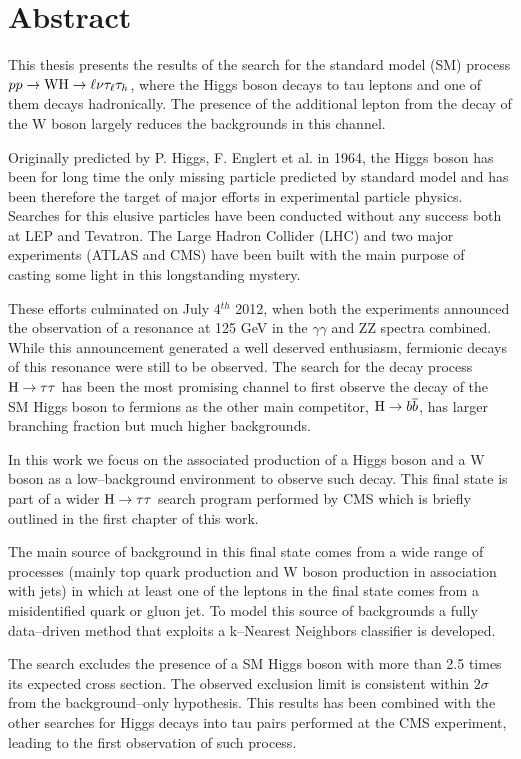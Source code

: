 \chapter*{Abstract}

This thesis presents the results of the search for the standard model (SM) process $pp \rightarrow \mathrm{W}\mathrm{H} \rightarrow \ell \nu \tau_\ell \tau_h$, where the Higgs boson decays to tau leptons and one of them decays hadronically. The presence of the additional lepton from the decay of the W boson largely reduces the backgrounds in this channel.

Originally predicted by P. Higgs, F. Englert et al. in 1964, the Higgs boson has been for long time the only missing particle predicted by standard model and has been therefore the target of major efforts in experimental particle physics. Searches for this elusive particles have been conducted without any success both at LEP and Tevatron. The Large Hadron Collider (LHC) and two major experiments (ATLAS and CMS) have been built with the main purpose of casting some light in this longstanding mystery. 

These efforts culminated on July 4$^{th}$ 2012, when both the experiments announced the observation of a resonance at 125 GeV in the $\gamma \gamma$ and ZZ spectra combined. While this announcement generated a well deserved enthusiasm, fermionic decays of this resonance were still to be observed. The search for the decay process $\mathrm{H} \rightarrow \tau \tau$ has been the most promising channel to first observe the decay of the SM Higgs boson to fermions as the other main competitor, $\mathrm{H} \rightarrow b\overline{b}$, has larger branching fraction but much higher backgrounds. 

In this work we focus on the associated production of a Higgs boson and a W boson as a low--background environment to observe such decay. This final state is part of a wider $\mathrm{H} \rightarrow \tau \tau$ search program performed by CMS which is briefly outlined in the first chapter of this work. 

The main source of background in this final state comes from a wide range of processes (mainly top quark production and W boson production in association with jets) in which at least one of the leptons in the final state comes from a misidentified quark or gluon jet. To model this source of backgrounds a fully data--driven method that exploits a k--Nearest Neighbors classifier is developed.

The search excludes the presence of a SM Higgs boson with more than 2.5 times its expected cross section. The observed exclusion limit is consistent within $2\sigma$ from the  background--only hypothesis. This results has been combined with the other searches for Higgs decays into tau pairs performed at the CMS experiment, leading to the first observation of such process.